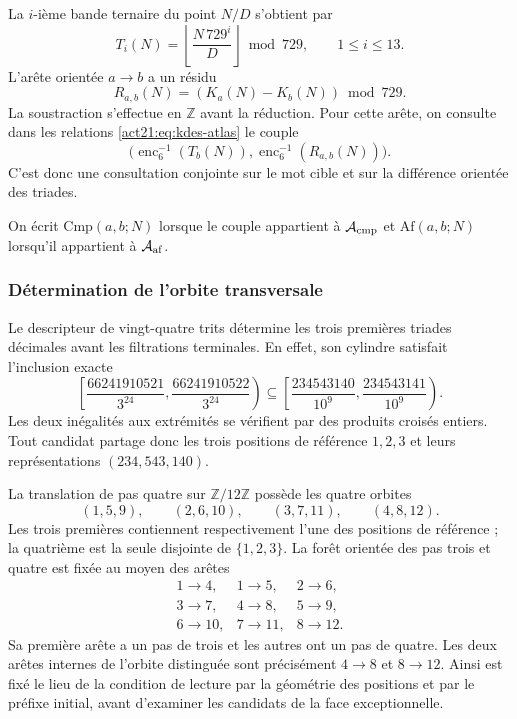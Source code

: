 La $i$-ième bande ternaire du point $N/D$ s'obtient par
\begin{equation}
 T_i(N)=\left\lfloor\frac{N\,729^i}{D}\right\rfloor\bmod729,
 \qquad1\leq i\leq13.
 \label{act21:eq:kdes-tercandidato}
\end{equation}
L'arête orientée $a\to b$ a un résidu
\begin{equation}
 R_{a,b}(N)=(K_a(N)-K_b(N))\bmod729.
 \label{act21:eq:kdes-resarista}
\end{equation}
La soustraction s'effectue en $\mathbb Z$ avant la réduction. Pour cette
arête, on consulte dans les relations \eqref{act21:eq:kdes-atlas} le couple
\[
 \bigl(\operatorname{enc}_6^{-1}(T_b(N)),
  \operatorname{enc}_6^{-1}(R_{a,b}(N))\bigr).
\]
C'est donc une consultation conjointe sur le mot cible et sur la différence orientée des triades.

On écrit $\mathrm{Cmp}(a,b;N)$ lorsque le couple appartient à $\mathcal A_{\rm cmp}$ et $\mathrm{Af}(a,b;N)$ lorsqu'il appartient à $\mathcal A_{\rm af}$.

\subsubsection{Détermination de l'orbite transversale}

Le descripteur de vingt-quatre trits détermine les trois premières triades décimales avant les filtrations terminales. En effet, son cylindre satisfait l'inclusion exacte
\[
 \left[\frac{66241910521}{3^{24}},
       \frac{66241910522}{3^{24}}\right)
 \subseteq
 \left[\frac{234543140}{10^9},
       \frac{234543141}{10^9}\right).
\]
Les deux inégalités aux extrémités se vérifient par des produits croisés
entiers. Tout candidat partage donc les trois positions de
référence $1,2,3$ et leurs représentations $(234,543,140)$.

La translation de pas quatre sur $\mathbb Z/12\mathbb Z$ possède les
quatre orbites
\[
 (1,5,9),\qquad(2,6,10),\qquad(3,7,11),\qquad(4,8,12).
\]
Les trois premières contiennent respectivement l'une des positions de référence ; la quatrième est la seule disjointe de $\{1,2,3\}$. La forêt orientée des pas trois et quatre est fixée au moyen des arêtes
\[
 \begin{array}{lll}
 1\to4,&1\to5,&2\to6,\\
 3\to7,&4\to8,&5\to9,\\
 6\to10,&7\to11,&8\to12.
 \end{array}
\]
Sa première arête a un pas de trois et les autres ont un pas de quatre. Les deux
arêtes internes de l'orbite distinguée sont précisément
$4\to8$ et $8\to12$. Ainsi est fixé le lieu de la condition de
lecture par la géométrie des positions et par le préfixe initial,
avant d'examiner les candidats de la face exceptionnelle.

